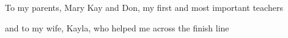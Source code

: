 
To my parents, Mary Kay and Don, my first and most important teachers

and to my wife, Kayla, who helped me across the finish line